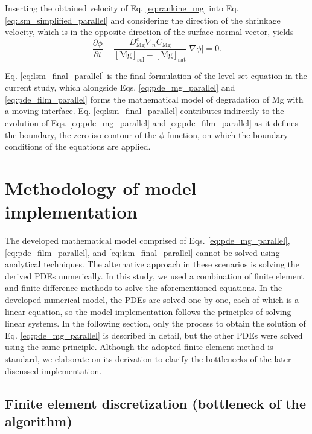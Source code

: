 Inserting the obtained velocity of Eq. \ref{eq:rankine_mg} into Eq. \ref{eq:lsm_simplified_parallel} and considering the direction of the shrinkage velocity, which is in the opposite direction of the surface normal vector, yields
\begin{equation} \label{eq:lsm_final_parallel}
\frac{\partial \phi}{\partial t}-\frac{D_{\mathrm{Mg}}^{e} \nabla_{n} C_\mathrm{Mg}}{[\mathrm{Mg}]_{\mathrm{sol}}-[\mathrm{Mg}]_{\mathrm{sat}}}|\nabla \phi|=0.
\end{equation}

Eq. \ref{eq:lsm_final_parallel} is the final formulation of the level set equation in the current study, which alongside Eqs. \ref{eq:pde_mg_parallel} and \ref{eq:pde_film_parallel} forms the mathematical model of degradation of Mg with a moving interface. Eq. \ref{eq:lsm_final_parallel} contributes indirectly to the evolution of Eqs. \ref{eq:pde_mg_parallel} and \ref{eq:pde_film_parallel} as it defines the boundary, the zero iso-contour of the $\phi$ function, on which the boundary conditions of the equations are applied.


\section{Methodology of model implementation}

The developed mathematical model comprised of Eqs. \ref{eq:pde_mg_parallel}, \ref{eq:pde_film_parallel}, and \ref{eq:lsm_final_parallel} cannot be solved using analytical techniques. The alternative approach in these scenarios is solving the derived \gls{PDE}s numerically. In this study, we used a combination of finite element and finite difference methods to solve the aforementioned equations. In the developed numerical model, the \gls{PDE}s are solved one by one, each of which is a linear equation, so the model implementation follows the principles of solving linear systems. In the following section, only the process to obtain the solution of Eq. \ref{eq:pde_mg_parallel} is described in detail, but the other \gls{PDE}s were solved using the same principle. Although the adopted finite element method is standard, we elaborate on its derivation to clarify the bottlenecks of the later-discussed implementation.

\subsection{Finite element discretization (bottleneck of the algorithm)}


